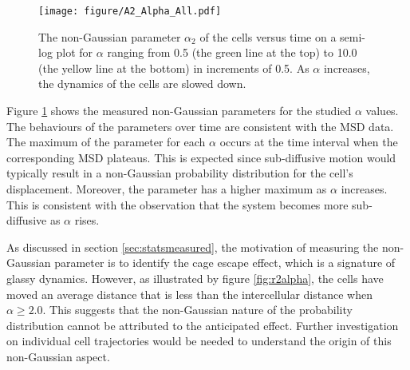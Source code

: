 \documentclass[a4paper,12pt]{article}
\begin{document}
\begin{figure}[h]
\centering
\texttt{[image: figure/A2\_Alpha\_All.pdf]}
\caption{The non-Gaussian parameter $\alpha_2$ of the cells versus time on a semi-log plot for $\alpha$ ranging from 0.5 (the green line at the top) to 10.0 (the yellow line at the bottom) in increments of 0.5. As $\alpha$ increases, the dynamics of the cells are slowed down.}
\label{fig:a2alpha}
\end{figure}

Figure \ref{fig:a2alpha} shows the measured non-Gaussian parameters for the studied $\alpha$ values. The behaviours of the parameters over time are consistent with the MSD data. The maximum of the parameter for each $\alpha$ occurs at the time interval when the corresponding MSD plateaus. This is expected since sub-diffusive motion would typically result in a non-Gaussian probability distribution for the cell's displacement. Moreover, the parameter has a higher maximum as $\alpha$ increases. This is consistent with the observation that the system becomes more sub-diffusive as $\alpha$ rises. 

As discussed in section \ref{sec:statsmeasured}, the motivation of measuring the non-Gaussian parameter is to identify the cage escape effect, which is a signature of glassy dynamics. However, as illustrated by figure \ref{fig:r2alpha}, the cells have moved an average distance that is less than the intercellular distance when $\alpha \ge 2.0$. This suggests that the non-Gaussian nature of the probability distribution cannot be attributed to the anticipated effect. Further investigation on individual cell trajectories would be needed to understand the origin of this non-Gaussian aspect. 
\end{document}
